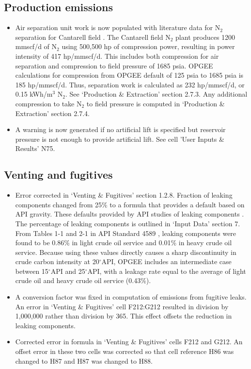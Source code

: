 \documentclass[11pt]{report}
\begin{document}
\subsection{Production emissions}

\begin{itemize}
\item Air separation unit work is now populated with literature data for N$_2$ separation for Cantarell field \cite{Kuo2001, Bocker2013}. The Cantarell field N$_2$ plant produces 1200 mmscf/d of N$_2$ using 500,500 hp of compression power, resulting in power intensity of 417 hp/mmscf/d. This includes both compression for air separation and compression to field pressure of 1685 psia. OPGEE calculations for compression from OPGEE default of 125 psia to 1685 psia is 185 hp/mmscf/d. Thus, separation work is calculated as 232 hp/mmscf/d, or 0.15 kWh/m$^3$ N$_2$. See `Production \& Extraction' section 2.7.3. Any additional compression to take N$_2$ to field pressure is computed in `Production \& Extraction' section 2.7.4. 
\item A warning is now generated if no artificial lift is specified but reservoir pressure is not enough to provide artificial lift. See cell 'User Inputs \& Results' N75. 
\end{itemize} 
\subsection{Venting and fugitives} 

\begin{itemize}
\item Error corrected in `Venting \& Fugitives' section 1.2.8. Fraction of leaking components changed from 25\% to a formula that provides a default based on API gravity. These defaults provided by API studies of leaking components \cite{API1993a}. The percentage of leaking components is outlined in `Input Data' section 7. From Tables 1-1 and 2-1 in API Standard 4589 \cite{API1993a}, leaking components were found to be 0.86\% in light crude oil service and 0.01\% in heavy crude oil service. Because using these values directly causes a sharp discontinuity in crude carbon intensity at 20$^\circ$API, OPGEE includes an intermediate case between 15$^\circ$API and 25$^\circ$API, with a leakage rate equal to the average of light crude oil and heavy crude oil service (0.43\%).
\item A conversion factor was fixed in computation of emissions from fugitive leaks. An error in `Venting \& Fugitives' cell F212:G212 resulted in division by 1,000,000 rather than division by 365. This effect offsets the reduction in leaking components. 
\item Corrected error in formula in `Venting \& Fugitives' cells F212 and G212. An offset error in these two cells was corrected so that cell reference H86 was changed to H87 and H87 was changed to H88. 
\end{itemize} 
\end{document}
